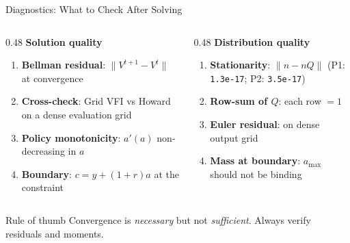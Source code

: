 \documentclass[aspectratio=169,11pt]{beamer}
\begin{document}
\begin{frame}{Diagnostics: What to Check After Solving}
    \begin{columns}[T]
        \begin{column}{0.48\textwidth}
            \small\textbf{Solution quality}
            \begin{enumerate}\setlength\itemsep{0.1em}
                \item \textbf{Bellman residual}: $\|V^{t+1}-V^t\|$ at convergence
                \item \textbf{Cross-check}: Grid VFI vs Howard on a dense evaluation grid
                \item \textbf{Policy monotonicity}: $a'(a)$ non-decreasing in $a$
                \item \textbf{Boundary}: $c = y + (1+r)a$ at the constraint
            \end{enumerate}
        \end{column}
        \begin{column}{0.48\textwidth}
            \small\textbf{Distribution quality}
            \begin{enumerate}\setlength\itemsep{0.1em}
                \item \textbf{Stationarity}: $\|n - nQ\|$ (P1: \texttt{1.3e-17}; P2: \texttt{3.5e-17})
                \item \textbf{Row-sum of $Q$}: each row $= 1$
                \item \textbf{Euler residual}: on dense output grid
                \item \textbf{Mass at boundary}: $a_{\max}$ should not be binding
            \end{enumerate}
        \end{column}
    \end{columns}

    \vspace{0.2em}
    \begin{block}{Rule of thumb}
        Convergence is \textit{necessary} but not \textit{sufficient}. Always verify residuals and moments.
    \end{block}
\end{frame}
\end{document}

